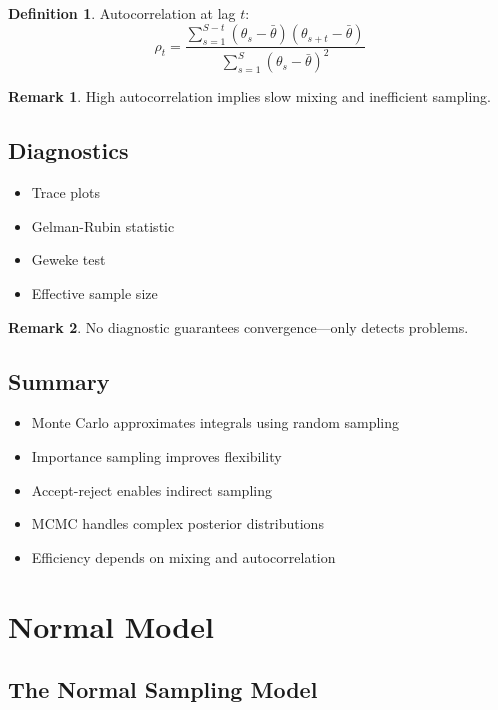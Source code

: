 \documentclass[12pt,oneside]{book}
\numberwithin{equation}{section}
\theoremstyle{definition}
\newtheorem{definition}{Definition}[section]
\newtheorem{remark}{Remark}[section]
\theoremstyle{plain}
\theoremstyle{remark}
\begin{document}
\begin{definition}
Autocorrelation at lag $t$:
$$
\rho_t =
\frac{\sum_{s=1}^{S-t} (\theta_s - \bar{\theta})(\theta_{s+t} - \bar{\theta})}
{\sum_{s=1}^S (\theta_s - \bar{\theta})^2}
$$
\end{definition}

\begin{remark}
High autocorrelation implies slow mixing and inefficient sampling.
\end{remark}

\section{Diagnostics}

\begin{itemize}
\item Trace plots
\item Gelman-Rubin statistic
\item Geweke test
\item Effective sample size
\end{itemize}

\begin{remark}
No diagnostic guarantees convergence—only detects problems.
\end{remark}

\section{Summary}

\begin{itemize}
\item Monte Carlo approximates integrals using random sampling
\item Importance sampling improves flexibility
\item Accept-reject enables indirect sampling
\item MCMC handles complex posterior distributions
\item Efficiency depends on mixing and autocorrelation
\end{itemize}

\chapter{Normal Model}

\section{The Normal Sampling Model}
\end{document}
